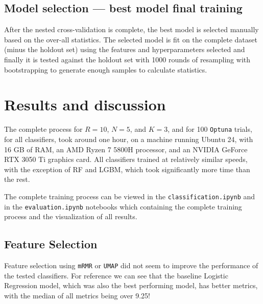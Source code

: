 \documentclass[12pt]{article}
\begin{document}
\subsection{Model selection --- best model final training}

After the nested cross-validation is complete, the best model is selected
manually based on the over-all statistics. The selected model is fit on the
complete dataset (minus the holdout set) using the features and hyperparameters
selected and finally it is tested against the holdout set with 1000 rounds of
resampling with bootstrapping to generate enough samples to calculate
statistics.


\section{Results and discussion}

The complete process for $R=10$, $N=5$, and $K=3$, and for 100 \texttt{Optuna}
trials, for all classifiers, took around one hour, on a machine running Ubuntu
24, with 16 GB of RAM, an AMD Ryzen 7 5800H processor, and an NVIDIA GeForce RTX
3050 Ti graphics card. All classifiers trained at relatively similar speeds,
with the exception of RF and LGBM, which took significantly more time than the
rest.

The complete training process can be viewed in the \texttt{classification.ipynb}
and in the \texttt{evaluation.ipynb} notebooks which containing the complete
training process and the visualization of all results.


\subsection{Feature Selection}

Feature selection using \texttt{mRMR} or \texttt{UMAP} did not seem to improve
the performance of the tested classifiers. For reference we can see that the
baseline Logistic Regression model, which was also the best performing model,
has better metrics, with the median of all metrics being over 9.25!
\end{document}

